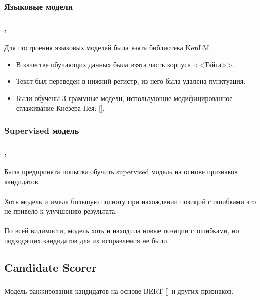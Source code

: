 \documentclass[t]{beamer}  %
\begin{document}
\subsubsection{Языковые модели}
\begin{frame}
	\frametitle{\insertsection} 
	\framesubtitle{\insertsubsection, \insertsubsubsection}
	Для построения языковых моделей была взята библиотека KenLM. 
	\begin{itemize}
		\item В качестве обучающих данных была взята часть корпуса <<Тайга>>.
		\item Текст был переведен в нижний регистр, из него была удалена пунктуация.
		\item Были обучены 3-граммные модели, использующие модифицированное сглаживание Кнезера-Нея: [\textcite{Chen1996}].
	\end{itemize}
\end{frame}

\subsubsection{Supervised модель}
\begin{frame}
	\frametitle{\insertsection} 
	\framesubtitle{\insertsubsection, \insertsubsubsection}
	Была предпринята попытка обучить supervised модель на основе признаков кандидатов. \\~\\
	
	Хоть модель и имела большую полноту при нахождении позиций с ошибками это не привело к улучшению результата.\\~\\
	
	По всей видимости, модель хоть и находила новые позиции с ошибками, но подходящих кандидатов для их исправления не было.
\end{frame}

\subsection{Candidate Scorer}
\begin{frame}
	\frametitle{\insertsection} 
	\framesubtitle{\insertsubsection}
	Модель ранжирования кандидатов на основе BERT [\textcite{Devlin2019}] и других признаков.
\end{frame}
\end{document}
